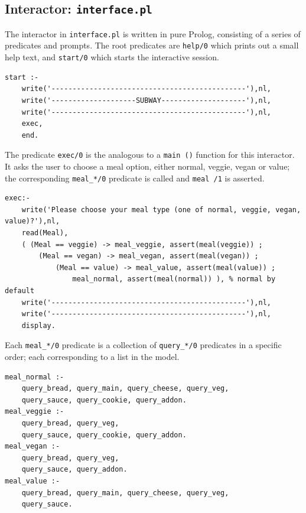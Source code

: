 \documentclass[11pt]{report}
\begin{document}
\subsection*{Interactor: \texttt{interface.pl}}

The interactor in \texttt{interface.pl} is written in pure Prolog, consisting
of a series of predicates and prompts. The root predicates are \texttt{help/0}
which prints out a small help text, and \texttt{start/0} which starts the
interactive session.

\begin{lstlisting}
start :-
    write('----------------------------------------------'),nl,
    write('--------------------SUBWAY--------------------'),nl,
    write('----------------------------------------------'),nl,
    exec,
    end.
\end{lstlisting}

The predicate \texttt{exec/0} is the analogous to a \texttt{main\,()} function for
this interactor. It asks the user to choose a meal option, either normal, veggie,
vegan or value; the corresponding \texttt{meal\_*/0} predicate is called and
\texttt{meal\,/1} is asserted. 

\begin{lstlisting}
exec:-
    write('Please choose your meal type (one of normal, veggie, vegan, value)?'),nl,
    read(Meal),
    ( (Meal == veggie) -> meal_veggie, assert(meal(veggie)) ;
        (Meal == vegan) -> meal_vegan, assert(meal(vegan)) ;
            (Meal == value) -> meal_value, assert(meal(value)) ;
                meal_normal, assert(meal(normal)) ), % normal by default
    write('----------------------------------------------'),nl,
    write('----------------------------------------------'),nl,
    display. 
\end{lstlisting}

Each \texttt{meal\_*/0} predicate is a collection of \texttt{query\_*/0} predicates
in a specific order; each corresponding to a list in the model.

\begin{lstlisting}
meal_normal :-
    query_bread, query_main, query_cheese, query_veg,
    query_sauce, query_cookie, query_addon.
meal_veggie :-
    query_bread, query_veg,
    query_sauce, query_cookie, query_addon.
meal_vegan :-
    query_bread, query_veg,
    query_sauce, query_addon.
meal_value :-
    query_bread, query_main, query_cheese, query_veg,
    query_sauce.
\end{lstlisting}
\end{document}
